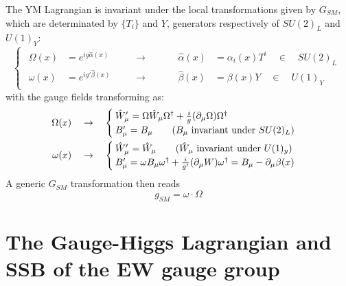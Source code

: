 \documentclass[TheoreticalPhy_ModB.tex]{subfiles}
\begin{document}
The YM Lagrangian is invariant under the local transformations given by $G_{SM}$, which are determinated by $\{T_i\}$ and $Y$, generators respectively of $SU(2)_L$ and $U(1)_Y$:
\[\begin{cases}\begin{aligned}
\Omega(x)&=e^{ig\hat\alpha(x)}\quad&&\to&&&\quad\hat\alpha(x)&=\alpha_i(x)T^i\quad\in\quad SU(2)_L\\
\omega(x)&=e^{ig'\hat\beta(x)}\quad&&\to&&&\quad\hat\beta(x)&=\beta(x)Y\quad\in\quad U(1)_Y
\end{aligned}\end{cases}\]
with the gauge fields transforming as:
\[\begin{aligned}
\Omega(x)\quad&\to\quad\begin{cases}
\hat W_\mu'=\Omega\hat W_\mu\Omega^\dagger+\frac ig(\partial_{\mu}\Omega)\Omega^\dagger\\
B_\mu'=B_\mu\qquad(B_\mu\text{ invariant under $SU(2)_L$})
\end{cases}	\\
\omega(x)\quad&\to\quad\begin{cases}
\hat W_\mu'=\hat W_\mu\qquad(\hat W_\mu\text{ invariant under $U(1)_y$})\\
B_\mu'=\omega B_\mu\omega^\dagger+\frac i{g'}(\partial_{\mu} W)\omega^\dagger=B_\mu-\partial_{\mu}\beta(x)
\end{cases}\end{aligned}\]
A generic $G_{SM}$ transformation then reads
\[g_{SM}=\omega\cdot\Omega\]


\section{The Gauge-Higgs Lagrangian and SSB of the EW gauge group}
\end{document}
